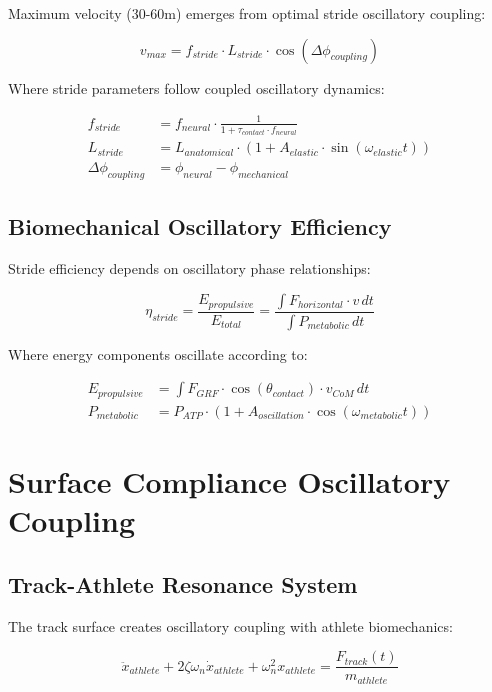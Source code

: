 \documentclass[12pt]{article}
\begin{document}
Maximum velocity (30-60m) emerges from optimal stride oscillatory coupling:

\begin{equation}
v_{max} = f_{stride} \cdot L_{stride} \cdot \cos(\Delta\phi_{coupling})
\end{equation}

Where stride parameters follow coupled oscillatory dynamics:

\begin{align}
f_{stride} &= f_{neural} \cdot \frac{1}{1 + \tau_{contact} \cdot f_{neural}} \\
L_{stride} &= L_{anatomical} \cdot \left(1 + A_{elastic} \cdot \sin(\omega_{elastic}t)\right) \\
\Delta\phi_{coupling} &= \phi_{neural} - \phi_{mechanical}
\end{align}

\subsection{Biomechanical Oscillatory Efficiency}

Stride efficiency depends on oscillatory phase relationships:

\begin{equation}
\eta_{stride} = \frac{E_{propulsive}}{E_{total}} = \frac{\int F_{horizontal} \cdot v \, dt}{\int P_{metabolic} \, dt}
\end{equation}

Where energy components oscillate according to:

\begin{align}
E_{propulsive} &= \int F_{GRF} \cdot \cos(\theta_{contact}) \cdot v_{CoM} \, dt \\
P_{metabolic} &= P_{ATP} \cdot \left(1 + A_{oscillation} \cdot \cos(\omega_{metabolic}t)\right)
\end{align}

\section{Surface Compliance Oscillatory Coupling}

\subsection{Track-Athlete Resonance System}

The track surface creates oscillatory coupling with athlete biomechanics:

\begin{equation}
\ddot{x}_{athlete} + 2\zeta\omega_n\dot{x}_{athlete} + \omega_n^2 x_{athlete} = \frac{F_{track}(t)}{m_{athlete}}
\end{equation}
\end{document}
